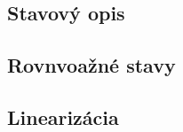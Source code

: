 \documentclass[../main.tex]{subfiles}
\begin{document}
	\subsection{Stavový opis}
	
	\subsection{Rovnvoažné stavy}
	
	\subsection{Linearizácia}
	
	
\end{document}
